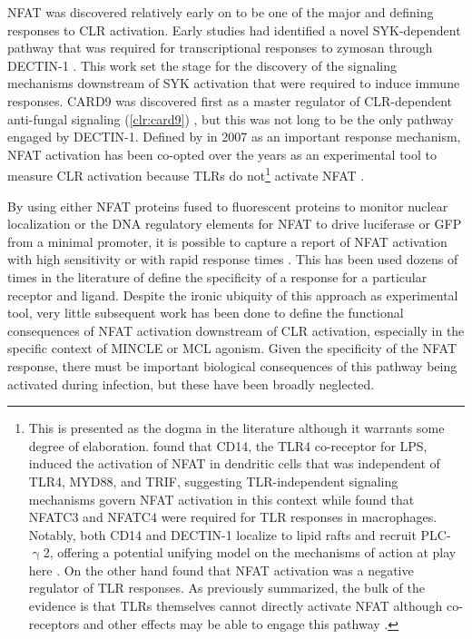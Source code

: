 NFAT was discovered relatively early on to be one of the major and defining responses to CLR activation. Early studies had identified a novel SYK\hyp{}dependent pathway that was required for transcriptional responses to zymosan through DECTIN\hyp{}1 \citep{Rogers2005}. This work set the stage for the discovery of the signaling mechanisms downstream of SYK activation that were required to induce immune responses. CARD9 was discovered first as a master regulator of CLR\hyp{}dependent anti\hyp{}fungal signaling (\autoref{clr:card9}) \citep{Gross2006, Hara2007}, but this was not long to be the only pathway engaged by DECTIN\hyp{}1. Defined by \citeauthor{Goodridge2007} in 2007 as an important response mechanism, NFAT activation has been co\hyp{}opted over the years as an experimental tool to measure CLR activation because TLRs do not\footnote{This is presented as the dogma in the literature although it warrants some degree of elaboration. \citeauthor{Zanoni2009} found that CD14, the TLR4 co\hyp{}receptor for LPS, induced the activation of NFAT in dendritic cells that was independent of TLR4, MYD88, and TRIF, suggesting TLR\hyp{}independent signaling mechanisms govern NFAT activation in this context while \citeauthor{Minematsu2011} found that NFATC3 and NFATC4 were required for TLR responses in macrophages. Notably, both CD14 and DECTIN\hyp{}1 localize to lipid rafts and recruit PLC\hyp{}$\upgamma$2, offering a potential unifying model on the mechanisms of action at play here \citep{Xu2009b}. On the other hand \citeauthor{Kang2007} found that NFAT activation was a negative regulator of TLR responses. As previously summarized, the bulk of the evidence is that TLRs themselves cannot directly activate NFAT although co\hyp{}receptors and other effects may be able to engage this pathway \citep{Zanoni2012}.} activate NFAT \citep{Yamasaki2009, Richardson2014, Ishikawa2013, Furukawa2013, Hattori2014}. 

By using either NFAT proteins fused to fluorescent proteins to monitor nuclear localization or the DNA regulatory elements for NFAT to drive luciferase or GFP from a minimal promoter, it is possible to capture a report of NFAT activation with high sensitivity or with rapid response times \citep{Colella2008, Gwack2006, Kar2015, Kar2016, Jauliac2002, Wilkins2004, Chow1999, Aramburu1998}. This has been used dozens of times in the literature of define the specificity of a response for a particular receptor and ligand. Despite the ironic ubiquity of this approach as experimental tool, very little subsequent work has been done to define the functional consequences of NFAT activation downstream of CLR activation, especially in the specific context of MINCLE or MCL agonism. Given the specificity of the NFAT response, there must be important biological consequences of this pathway being activated during infection, but these have been broadly neglected. 

